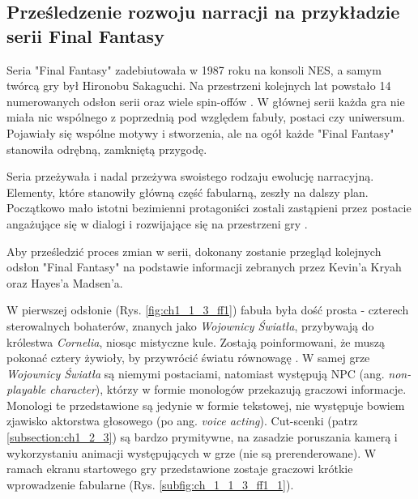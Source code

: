 \subsection{Prześledzenie rozwoju narracji na przykładzie serii Final Fantasy}\label{subsection:ch1_1_3}


Seria "Final Fantasy" zadebiutowała w 1987 roku na konsoli NES, a samym twórcą gry był Hironobu
Sakaguchi. Na przestrzeni kolejnych lat powstało 14 numerowanych odsłon serii oraz wiele spin-offów
\cite{the_evolution_of_final_fantasy}. W głównej serii każda gra nie miała nic wspólnego z poprzednią
pod względem fabuły, postaci czy uniwersum. Pojawiały się wspólne motywy i stworzenia, ale na ogół
każde "Final Fantasy" stanowiła odrębną, zamkniętą przygodę\cite{the_evolution_of_final_fantasy}.

Seria przeżywała i nadal przeżywa swoistego rodzaju ewolucję narracyjną. Elementy, które stanowiły
główną część fabularną, zeszły na dalszy plan. Początkowo mało istotni bezimienni protagoniści zostali
zastąpieni przez postacie angażujące się w dialogi i rozwijające się na przestrzeni gry
\cite{the_evolution_of_final_fantasy}.

Aby prześledzić proces zmian w serii, dokonany zostanie przegląd kolejnych odsłon "Final Fantasy" na
podstawie informacji zebranych przez Kevin'a Kryah\cite{the_evolution_of_final_fantasy} oraz
Hayes'a Madsen'a\cite{25_years_later}.

W pierwszej odsłonie (Rys. \ref{fig:ch1_1_3_ff1}) fabuła była dość prosta - czterech sterowalnych
bohaterów, znanych jako \textit{Wojownicy Światła}, przybywają do królestwa \textit{Cornelia}, niosąc
mistyczne kule. Zostają poinformowani, że muszą pokonać cztery żywioły, by przywrócić światu równowagę
\cite{the_evolution_of_final_fantasy}. W samej grze \textit{Wojownicy Światła} są niemymi postaciami,
natomiast występują NPC (ang. \textit{non-playable character}), którzy w formie monologów przekazują
graczowi informacje. Monologi te przedstawione są jedynie w formie tekstowej, nie występuje bowiem
zjawisko aktorstwa głosowego (po ang. \textit{voice acting}). Cut-scenki (patrz \ref{subsection:ch1_2_3})
są bardzo prymitywne, na zasadzie poruszania kamerą i wykorzystaniu animacji występujących w grze
(nie są prerenderowane). W ramach ekranu startowego gry przedstawione zostaje graczowi krótkie
wprowadzenie fabularne (Rys. \ref{subfig:ch_1_1_3_ff1_1}).

